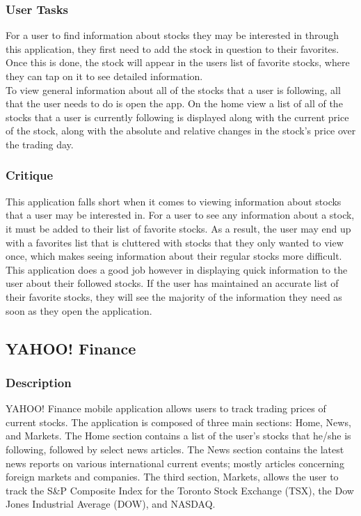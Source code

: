 \documentclass{sigchi}
\begin{document}
\subsubsection{User Tasks}
For a user to find information about stocks they may be interested in through this application, they first need to add the stock in question to their favorites.  Once this is done, the stock will appear in the users list of favorite stocks, where they can tap on it to see detailed information.\\
To view general information about all of the stocks that a user is following, all that the user needs to do is open the app.  On the home view a list of all of the stocks that a user is currently following is displayed along with the current price of the stock, along with the absolute and relative changes in the stock's price over the trading day.

\subsubsection{Critique}
This application falls short when it comes to viewing information about stocks that a user may be interested in.  For a user to see any information about a stock, it must be added to their list of favorite stocks.  As a result, the user may end up with a favorites list that is cluttered with stocks that they only wanted to view once, which makes seeing information about their regular stocks more difficult.  This application does a good job however in displaying quick information to the user about their followed stocks.  If the user has maintained an accurate list of their favorite stocks, they will see the majority of the information they need as soon as they open the application.



\subsection{YAHOO! Finance}
\subsubsection{Description}
YAHOO! Finance mobile application allows users to track trading prices of current stocks. The application is composed of three main sections: Home, News, and Markets. The Home section contains a list of the user’s stocks that he/she is following, followed by select news articles. The News section contains the latest news reports on various international current events; mostly articles concerning foreign markets and companies. The third section, Markets, allows the user to track the S\&P Composite Index for the Toronto Stock Exchange (TSX), the Dow Jones Industrial Average (DOW), and NASDAQ. 
\end{document}
